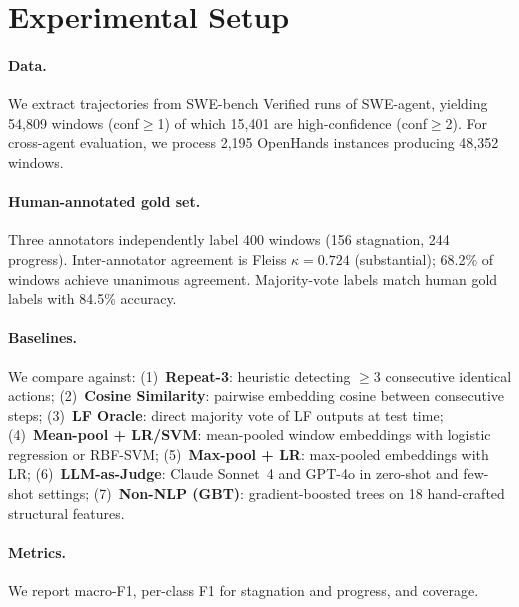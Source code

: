\documentclass[11pt,a4paper]{article}
\begin{document}
\section{Experimental Setup}

\paragraph{Data.}
We extract trajectories from SWE-bench Verified runs of SWE-agent, yielding 54,809 windows (conf$\geq$1) of which 15,401 are high-confidence (conf$\geq$2).
For cross-agent evaluation, we process 2,195 OpenHands instances producing 48,352 windows.

\paragraph{Human-annotated gold set.}
Three annotators independently label 400 windows (156 stagnation, 244 progress).
Inter-annotator agreement is Fleiss $\kappa=0.724$ (substantial); 68.2\% of windows achieve unanimous agreement.
Majority-vote labels match human gold labels with 84.5\% accuracy.

\paragraph{Baselines.}
We compare against:
(1)~\textbf{Repeat-3}: heuristic detecting $\geq$3 consecutive identical actions;
(2)~\textbf{Cosine Similarity}: pairwise embedding cosine between consecutive steps;
(3)~\textbf{LF Oracle}: direct majority vote of LF outputs at test time;
(4)~\textbf{Mean-pool + LR/SVM}: mean-pooled window embeddings with logistic regression or RBF-SVM;
(5)~\textbf{Max-pool + LR}: max-pooled embeddings with LR;
(6)~\textbf{LLM-as-Judge}: Claude Sonnet~4 and GPT-4o in zero-shot and few-shot settings;
(7)~\textbf{Non-NLP (GBT)}: gradient-boosted trees on 18 hand-crafted structural features.

\paragraph{Metrics.}
We report macro-F1, per-class F1 for stagnation and progress, and coverage.

\end{document}
